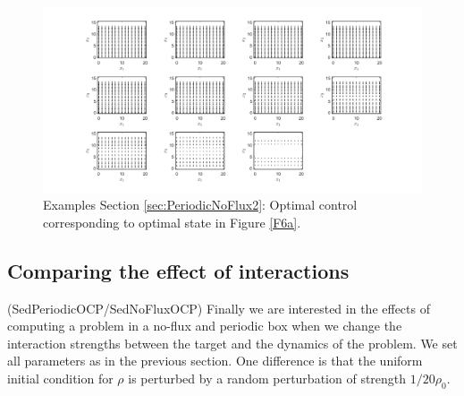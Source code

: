\documentclass[11pt, a4paper]{article}
\theoremstyle{definition}
\begin{document}
\begin{figure}[h]
	\centering
	\includegraphics[scale=0.35]{ConOptPeri6.png}
	\caption{Examples Section \ref{sec:PeriodicNoFlux2}: Optimal control corresponding to optimal state in Figure \ref{F6a}.} 
	\label{F6b}
\end{figure}


\subsection{Comparing the effect of interactions} \label{sec:PeriodicNoFlux3}
(SedPeriodicOCP/SedNoFluxOCP)
Finally we are interested in the effects of computing a problem in a no-flux and periodic box when we change the interaction strengths between the target and the dynamics of the problem.
We set all parameters as in the previous section. One difference is that the uniform initial condition for $\rho$ is perturbed by a random perturbation of strength $1/20 \rho_0$.
\end{document}
